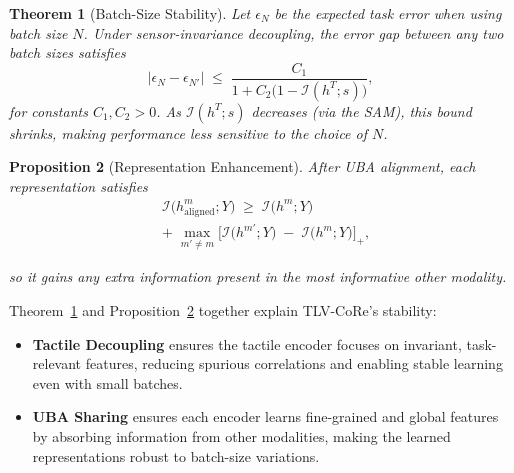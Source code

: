 \documentclass[letterpaper]{article} %
\theoremstyle{definition}                %
\theoremstyle{plain}                     %
\newtheorem{theorem}{Theorem}[section]
\newtheorem{proposition}[theorem]{Proposition}
\theoremstyle{remark}                    %
\begin{document}
\begin{theorem}[Batch-Size Stability]
\label{thm:batch_stability}
Let $\epsilon_N$ be the expected task error when using batch size $N$. Under sensor-invariance decoupling, the error gap between any two batch sizes satisfies
\begin{equation}
|\epsilon_N - \epsilon_{N'}|
\;\le\;
\frac{C_1}{1 + C_2\bigl(1 - \mathcal{I}(h^T; s)\bigr)},
\end{equation}
for constants $C_1,C_2>0$. As $\mathcal{I}(h^T; s)$ decreases (via the SAM), this bound shrinks, making performance less sensitive to the choice of $N$.
\end{theorem}

\begin{proposition}[Representation Enhancement]
\label{prop:feature_learning}
After UBA alignment, each representation satisfies
\begin{equation}
\begin{aligned}
&\mathcal{I}\!\bigl(h^m_{\mathrm{aligned}};Y\bigr)
\;\ge\;\mathcal{I}\!\bigl(h^m;Y\bigr)
\\
&+\;\max_{m'\neq m}\bigl[\mathcal{I}\!\bigl(h^{m'};Y\bigr)\;-\;\mathcal{I}\!\bigl(h^m;Y\bigr)\bigr]_+,
\end{aligned}
\end{equation}

so it gains any extra information present in the most informative other modality.
\end{proposition}

Theorem~\ref{thm:batch_stability} and Proposition~\ref{prop:feature_learning} together explain TLV-CoRe’s stability:
\begin{itemize}[leftmargin=*, itemsep=0pt, topsep=0pt]
    \item \textbf{Tactile Decoupling} ensures the tactile encoder focuses on invariant, task-relevant features, reducing spurious correlations and enabling stable learning even with small batches.
    \item \textbf{UBA Sharing} ensures each encoder learns fine-grained and global features by absorbing information from other modalities, making the learned representations robust to batch-size variations.
\end{itemize}
\end{document}
